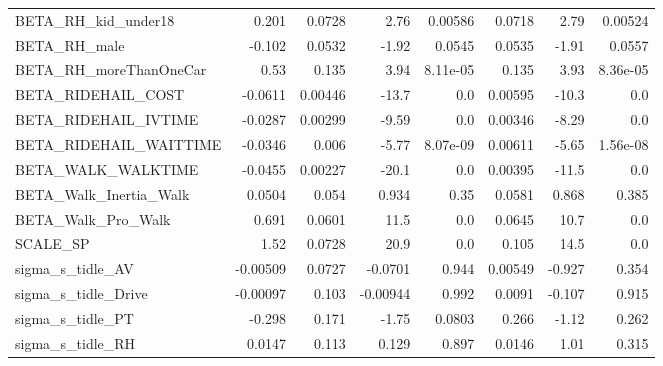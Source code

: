 \begin{tabular}{lrrrrrrr}
BETA\_RH\_kid\_under18          &    0.201 &   0.0728 &     2.76 &  0.00586 &        0.0718 &         2.79 &       0.00524 \\
BETA\_RH\_male                 &   -0.102 &   0.0532 &    -1.92 &   0.0545 &        0.0535 &        -1.91 &        0.0557 \\
BETA\_RH\_moreThanOneCar       &     0.53 &    0.135 &     3.94 & 8.11e-05 &         0.135 &         3.93 &      8.36e-05 \\
BETA\_RIDEHAIL\_COST           &  -0.0611 &  0.00446 &    -13.7 &      0.0 &       0.00595 &        -10.3 &           0.0 \\
BETA\_RIDEHAIL\_IVTIME         &  -0.0287 &  0.00299 &    -9.59 &      0.0 &       0.00346 &        -8.29 &           0.0 \\
BETA\_RIDEHAIL\_WAITTIME       &  -0.0346 &    0.006 &    -5.77 & 8.07e-09 &       0.00611 &        -5.65 &      1.56e-08 \\
BETA\_WALK\_WALKTIME           &  -0.0455 &  0.00227 &    -20.1 &      0.0 &       0.00395 &        -11.5 &           0.0 \\
BETA\_Walk\_Inertia\_Walk       &   0.0504 &    0.054 &    0.934 &     0.35 &        0.0581 &        0.868 &         0.385 \\
BETA\_Walk\_Pro\_Walk           &    0.691 &   0.0601 &     11.5 &      0.0 &        0.0645 &         10.7 &           0.0 \\
SCALE\_SP                     &     1.52 &   0.0728 &     20.9 &      0.0 &         0.105 &         14.5 &           0.0 \\
sigma\_s\_tidle\_AV             & -0.00509 &   0.0727 &  -0.0701 &    0.944 &       0.00549 &       -0.927 &         0.354 \\
sigma\_s\_tidle\_Drive          & -0.00097 &    0.103 & -0.00944 &    0.992 &        0.0091 &       -0.107 &         0.915 \\
sigma\_s\_tidle\_PT             &   -0.298 &    0.171 &    -1.75 &   0.0803 &         0.266 &        -1.12 &         0.262 \\
sigma\_s\_tidle\_RH             &   0.0147 &    0.113 &    0.129 &    0.897 &        0.0146 &         1.01 &         0.315 \\
\bottomrule
\end{tabular}

